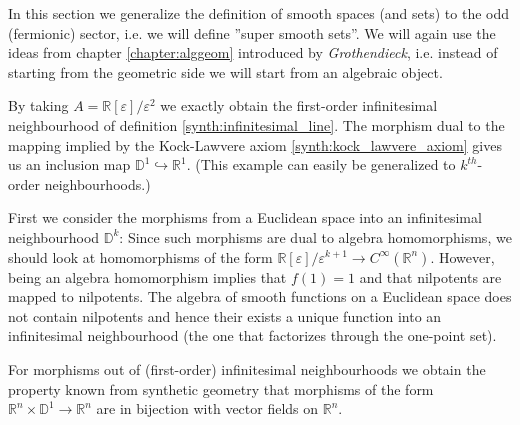     In this section we generalize the definition of smooth spaces (and sets) to the odd (fermionic) sector, i.e. we will define ''super smooth sets''. We will again use the ideas from chapter \ref{chapter:alggeom} introduced by \textit{Grothendieck}, i.e. instead of starting from the geometric side we will start from an algebraic object.
    \begin{example}
        By taking $A=\mathbb{R}[\varepsilon]/\varepsilon^2$ we exactly obtain the first-order infinitesimal neighbourhood of definition \ref{synth:infinitesimal_line}. The morphism dual to the mapping implied by the Kock-Lawvere axiom \ref{synth:kock_lawvere_axiom} gives us an inclusion map $\mathbb{D}^1\hookrightarrow\mathbb{R}^1$. (This example can easily be generalized to $k^{th}$-order neighbourhoods.)
    \end{example}

    \begin{property}
        First we consider the morphisms from a Euclidean space into an infinitesimal neighbourhood $\mathbb{D}^k$: Since such morphisms are dual to algebra homomorphisms, we should look at homomorphisms of the form $\mathbb{R}[\varepsilon]/\varepsilon^{k+1}\rightarrow C^\infty(\mathbb{R}^n)$. However, being an algebra homomorphism implies that $f(1)=1$ and that nilpotents are mapped to nilpotents. The algebra of smooth functions on a Euclidean space does not contain nilpotents and hence their exists a unique function into an infinitesimal neighbourhood (the one that factorizes through the one-point set).

        For morphisms out of (first-order) infinitesimal neighbourhoods we obtain the property known from synthetic geometry that morphisms of the form $\mathbb{R}^n\times\mathbb{D}^1\rightarrow\mathbb{R}^n$ are in bijection with vector fields on $\mathbb{R}^n$.
    \end{property}

